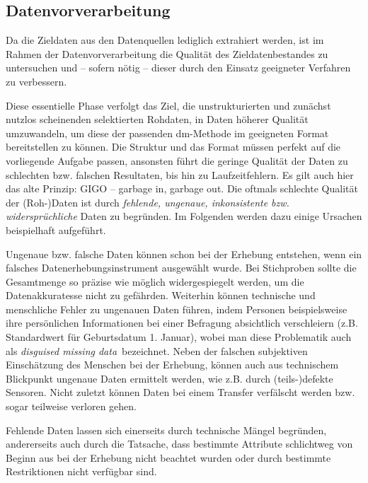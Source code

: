 \subsection{Datenvorverarbeitung}
\glqq Da die Zieldaten aus den Datenquellen lediglich extrahiert werden, ist im Rahmen der Datenvorverarbeitung die Qualität des Zieldatenbestandes zu untersuchen und – sofern nötig – dieser durch den Einsatz geeigneter Verfahren zu verbessern.\grqq{}

Diese essentielle Phase verfolgt das Ziel, die unstrukturierten und zunächst nutzlos scheinenden selektierten Rohdaten, in Daten höherer Qualität umzuwandeln, um diese der passenden \gls{dm}-Methode im geeigneten Format bereitstellen zu können. Die Struktur und das Format müssen perfekt auf die vorliegende Aufgabe passen, ansonsten führt die geringe Qualität der Daten zu schlechten bzw. falschen Resultaten, bis hin zu Laufzeitfehlern. Es gilt auch hier das alte Prinzip: GIGO – garbage in, garbage out. Die oftmals schlechte Qualität der (Roh-)Daten ist durch \textit{fehlende, ungenaue, inkonsistente bzw. widersprüchliche} Daten zu begründen. Im Folgenden werden dazu einige Ursachen beispielhaft aufgeführt.

Ungenaue bzw. falsche Daten können schon bei der Erhebung entstehen, wenn ein falsches Datenerhebungsinstrument ausgewählt wurde. Bei Stichproben sollte die Gesamtmenge so präzise wie möglich widergespiegelt werden, um die Datenakkuratesse nicht zu gefährden. Weiterhin können technische und menschliche Fehler zu ungenauen Daten führen, indem Personen beispielsweise ihre persönlichen Informationen bei einer Befragung absichtlich verschleiern (z.B. Standardwert für Geburtsdatum 1. Januar), wobei man diese Problematik auch als \textit{\glqq disguised missing data\grqq}~bezeichnet. Neben der falschen subjektiven Einschätzung des Menschen bei der Erhebung, können auch aus technischem Blickpunkt ungenaue Daten ermittelt werden, wie z.B. durch (teils-)defekte Sensoren. Nicht zuletzt können Daten bei einem Transfer verfälscht werden bzw. sogar teilweise verloren gehen.

Fehlende Daten lassen sich einerseits durch technische Mängel begründen, andererseits auch durch die Tatsache, dass bestimmte Attribute schlichtweg von Beginn aus bei der Erhebung nicht beachtet wurden oder durch bestimmte Restriktionen nicht verfügbar sind.

